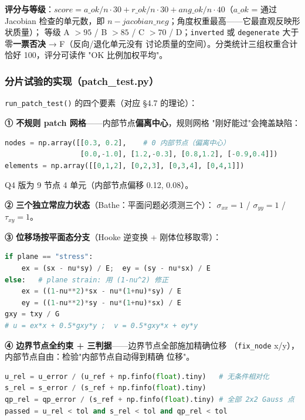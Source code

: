 \documentclass[12pt,a4paper]{ctexart}
\newcommand{\fem}{\Verb}
\begin{document}
\textbf{评分与等级}：$score = a\_ok/n \cdot 30 + r\_ok/n \cdot 30 +
ang\_ok/n \cdot 40$（$a\_ok$ = 通过 Jacobian 检查的单元数，即
$n - jacobian\_neg$；角度权重最高——它最直观反映形状质量）；
等级 A $>95$ / B $>85$ / C $>70$ / D；\fem|inverted| 或
\fem|degenerate| 大于零\textbf{一票否决} → F（反向/退化单元没有
讨论质量的空间）。分类统计三组权重合计恰好 100，评分可读作
"OK 比例加权平均"。

\subsubsection{分片试验的实现（patch\_test.py）}

\fem|run_patch_test()| 的四个要素（对应 §4.7 的理论）：

\textbf{① 不规则 patch 网格}——内部节点\textbf{偏离中心}，规则网格
"刚好能过"会掩盖缺陷：

\begin{lstlisting}[language=python]
nodes = np.array([[0.3, 0.2],    # 0 内部节点（偏离中心）
                  [0.0,-1.0], [1.2,-0.3], [0.8,1.2], [-0.9,0.4]])
elements = np.array([[0,1,2], [0,2,3], [0,3,4], [0,4,1]])
\end{lstlisting}

Q4 版为 9 节点 4 单元（内部节点偏移 0.12, 0.08）。

\textbf{② 三个独立常应力状态}（Bathe：平面问题必须测三个）：
$\sigma_{xx}=1$ / $\sigma_{yy}=1$ / $\tau_{xy}=1$。

\textbf{③ 位移场按平面态分支}（Hooke 逆变换 + 刚体位移取零）：

\begin{lstlisting}[language=python]
if plane == "stress":
    ex = (sx - nu*sy) / E;  ey = (sy - nu*sx) / E
else:   # plane strain: 用 (1-nu^2) 修正
    ex = ((1-nu**2)*sx - nu*(1+nu)*sy) / E
    ey = ((1-nu**2)*sy - nu*(1+nu)*sx) / E
gxy = txy / G
# u = ex*x + 0.5*gxy*y ;  v = 0.5*gxy*x + ey*y
\end{lstlisting}

\textbf{④ 边界节点全约束 + 三判据}——边界节点全部施加精确位移
（\fem|fix_node| x/y），内部节点自由：检验"内部节点自动得到精确
位移"。

\begin{lstlisting}[language=python]
u_rel = u_error / (u_ref + np.finfo(float).tiny)   # 无条件相对化
s_rel = s_error / (s_ref + np.finfo(float).tiny)
qp_rel = qp_error / (s_ref + np.finfo(float).tiny) # 全部 2x2 Gauss 点
passed = u_rel < tol and s_rel < tol and qp_rel < tol
\end{lstlisting}
\end{document}
